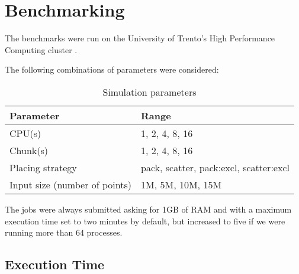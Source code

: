 \section{Benchmarking}
\label{sec:benchmarking}

The benchmarks were run on the University of Trento's High Performance Computing cluster
.

The following combinations of parameters were considered:

\begin{table}[ht]
  \centering
  \caption{Simulation parameters}
  \begin{tabular}{l|l}
    \hline
    Parameter                                        & Range                                    \\
    \hline
    CPU(s)                                           & {1, 2, 4, 8, 16}                         \\
    Chunk(s)                                         & {1, 2, 4, 8, 16}                         \\
    Placing strategy \cite[§4.7.1]{pbs_super_manual} & {pack, scatter, pack:excl, scatter:excl} \\
    Input size (number of points)                    & {1M, 5M, 10M, 15M }                      \\
    \hline
  \end{tabular}
\end{table}

The jobs were always submitted asking for 1GB of RAM and with a maximum execution time set to two minutes by default, but increased to five if we were running more than 64 processes.


\subsection{Execution Time}


